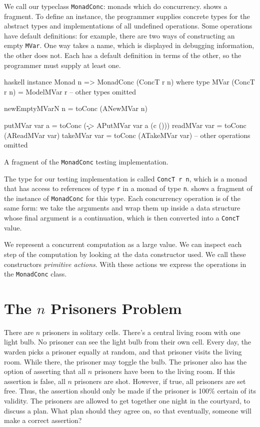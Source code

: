 We call our typeclass \verb|MonadConc|: monads which do concurrency.
 shows a fragment.  To define an instance, the
programmer supplies concrete types for the abstract types and
implementations of all undefined operations.  Some operations have
default definitions: for example, there are two ways of constructing
an empty \verb|MVar|.  One way takes a name, which is displayed in
debugging information, the other does not.  Each has a default
definition in terms of the other, so the programmer must supply at
least one.

\begin{listing}
\centering
\begin{cminted}{haskell}
instance Monad n => MonadConc (ConcT r n) where
  type MVar (ConcT r n) = ModelMVar r
  -- other types omitted

  newEmptyMVarN n = toConc (ANewMVar n)

  putMVar  var a = toConc (\c -> APutMVar var a (c ()))
  readMVar var   = toConc (AReadMVar var)
  takeMVar var   = toConc (ATakeMVar var)
  -- other operations omitted
\end{cminted}
\caption{A fragment of the \texttt{MonadConc} testing implementation.}\label{lst:mvarops}
\end{listing}

The type for our testing implementation is called \verb|ConcT r n|,
which is a monad that has access to references of type \verb|r| in a
monad of type \verb|n|.   shows a fragment of the
instance of \verb|MonadConc| for this type.  Each concurrency
operation is of the same form: we take the arguments and wrap them up
inside a data structure whose final argument is a continuation, which
is then converted into a \verb|ConcT| value.

We represent a concurrent computation as a large value.  We can
inspect each step of the computation by looking at the data
constructor used.  We call these constructors \emph{primitive
  actions}.  With these actions we express the operations in the
\verb|MonadConc| class.

\section{The $n$ Prisoners Problem}
\label{sec:dejafu-100}

\begin{displayquote}
  There are $n$ prisoners in solitary cells.  There's a central living
  room with one light bulb.  No prisoner can see the light bulb from
  their own cell.  Every day, the warden picks a prisoner equally at
  random, and that prisoner visits the living room.  While there, the
  prisoner may toggle the bulb.  The prisoner also has the option of
  asserting that all $n$ prisoners have been to the living room.  If
  this assertion is false, all $n$ prisoners are shot.  However, if
  true, all prisoners are set free.  Thus, the assertion should only
  be made if the prisoner is 100\% certain of its validity.  The
  prisoners are allowed to get together one night in the courtyard, to
  discuss a plan.  What plan should they agree on, so that eventually,
  someone will make a correct assertion?
\end{displayquote}

